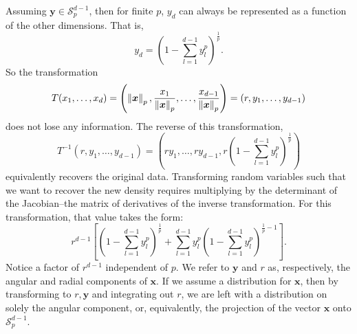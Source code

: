 Assuming $\bm{y} \in \mathcal{S}_{p}^{d-1}$, then for finite $p$, $y_d$ can always be represented
  as a function of the other dimensions.  That is,
  \begin{equation*}
    y_d = \left(1 - \sum_{l = 1}^{d-1}y_l^p\right)^{\frac{1}{p}}.
  \end{equation*}
  So the transformation
  \begin{equation}
    \label{eqn:pnormt}
    T(x_1,\ldots,x_d) = \left(\left\lVert \bm{x} \right\rVert_{p}, \frac{x_1}{\left\lVert \bm{x} \right\rVert_{p}},
                          \ldots , \frac{x_{d-1}}{\left\lVert \bm{x} \right\rVert_{p}}\right) = (r,y_1,\ldots,y_{d-1})
  \end{equation}
  does not lose any information.  The reverse of this transformation,
  \begin{equation}
    \label{eqn:pnormtinv}
    T^{-1}\left(r,y_1,\ldots,y_{d-1}\right) =
      \left(ry_1,\ldots,ry_{d-1}, r\left(1 - {\scriptstyle\sum}_{l = 1}^{d-1}y_l^p\right)^{\frac{1}{p}}\right)
  \end{equation}
  equivalently recovers the original data.  Transforming random variables such that we want to recover
  the new density requires multiplying by the determinant of the Jacobian--the matrix of derivatives
  of the inverse transformation.  For this transformation, that value takes the form:
  \begin{equation}
    \label{eqn:pnormjac}
    r^{d-1}\left[\left(1 - \sum_{l = 1}^{d-1}y_l^p\right)^{\frac{1}{p}} +
        \sum_{l = 1}^{d-1}y_l^p\left(1 - \sum_{l=1}^{d-1} y_l^p\right)^{\frac{1}{p} - 1}\right].
  \end{equation}
  Notice a factor of $r^{d-1}$ independent of $p$. We refer to $\bm{y}$ and $r$ as, respectively,
  the angular and radial components of $\bm{x}$.  If we assume a distribution for $\bm{x}$, then
  by transforming to $r, \bm{y}$ and integrating out $r$, we are left with a distribution on solely
  the angular component, or, equivalently, the projection of the vector $\bm{x}$ onto
  $\mathcal{S}_{p}^{d-1}$.

